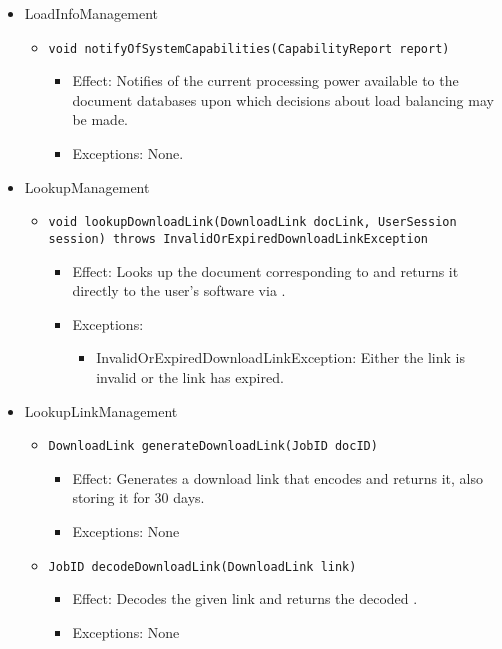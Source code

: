 \begin{itemize}
    \item LoadInfoManagement
    \begin{itemize}
        \item \texttt{void notifyOfSystemCapabilities(CapabilityReport report)}
        \begin{itemize}
            \item Effect: Notifies of the current processing power available to the document databases upon which decisions about load balancing may be made.
            \item Exceptions: None.
        \end{itemize}
    \end{itemize}

    \item LookupManagement
    \begin{itemize}
        \item \texttt{void lookupDownloadLink(DownloadLink docLink, UserSession session) throws InvalidOrExpiredDownloadLinkException}
        \begin{itemize}
            \item Effect: Looks up the document corresponding to  and returns it directly to the user's software via .
            \item Exceptions:
            \begin{itemize}
                \item InvalidOrExpiredDownloadLinkException: Either the link is invalid or the link has expired.
            \end{itemize}
        \end{itemize}
    \end{itemize}

	\item LookupLinkManagement
    \begin{itemize}
        \item \texttt{DownloadLink generateDownloadLink(JobID docID)}
        \begin{itemize}
            \item Effect: Generates a download link that encodes  and returns it, also storing it for 30 days.
            \item Exceptions: None
        \end{itemize}

        \item \texttt{JobID decodeDownloadLink(DownloadLink link)}
		    \begin{itemize}
                \item Effect: Decodes the given link and returns the decoded .
                \item Exceptions: None
            \end{itemize}


\end{itemize}
\end{itemize}
